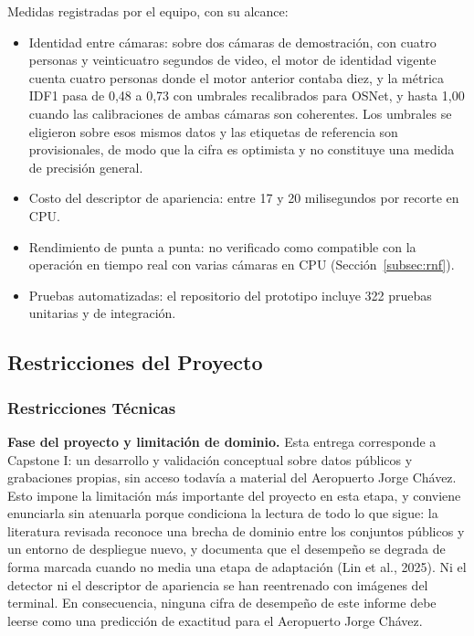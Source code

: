 Medidas registradas por el equipo, con su alcance:

\begin{itemize}
  \item Identidad entre cámaras: sobre dos cámaras de demostración, con cuatro personas y
  veinticuatro segundos de video, el motor de identidad vigente cuenta cuatro personas donde
  el motor anterior contaba diez, y la métrica IDF1 pasa de 0,48 a 0,73 con umbrales
  recalibrados para OSNet, y hasta 1,00 cuando las calibraciones de ambas cámaras son
  coherentes. Los umbrales se eligieron sobre esos mismos datos y las etiquetas de referencia
  son provisionales, de modo que la cifra es optimista y no constituye una medida de precisión
  general.
  \item Costo del descriptor de apariencia: entre 17 y 20 milisegundos por recorte en CPU.
  \item Rendimiento de punta a punta: no verificado como compatible con la operación en
  tiempo real con varias cámaras en CPU (Sección~\ref{subsec:rnf}).
  \item Pruebas automatizadas: el repositorio del prototipo incluye 322 pruebas unitarias y de
  integración.
\end{itemize}

\subsection{Restricciones del Proyecto}
\label{subsec:restricciones}

\subsubsection{Restricciones Técnicas}

\textbf{Fase del proyecto y limitación de dominio.} Esta entrega corresponde a Capstone I: un
desarrollo y validación conceptual sobre datos públicos y grabaciones propias, sin acceso
todavía a material del Aeropuerto Jorge Chávez. Esto impone la limitación más importante del
proyecto en esta etapa, y conviene enunciarla sin atenuarla porque condiciona la lectura de
todo lo que sigue: la literatura revisada reconoce una brecha de dominio entre los conjuntos
públicos y un entorno de despliegue nuevo, y documenta que el desempeño se degrada de
forma marcada cuando no media una etapa de adaptación (Lin et al., 2025). Ni el detector ni el
descriptor de apariencia se han reentrenado con imágenes del terminal. En consecuencia,
ninguna cifra de desempeño de este informe debe leerse como una predicción de exactitud
para el Aeropuerto Jorge Chávez.

